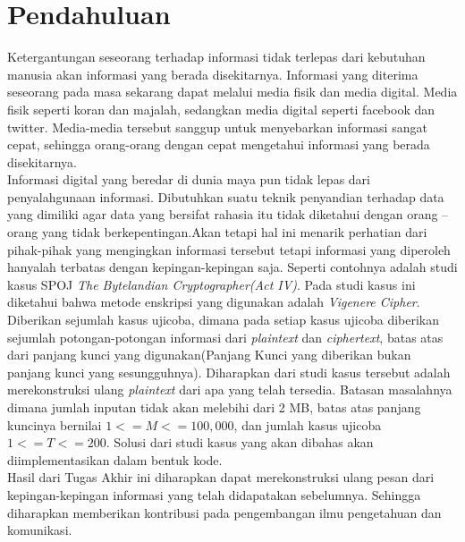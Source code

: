 \section{Pendahuluan}
Ketergantungan seseorang terhadap informasi tidak terlepas dari kebutuhan manusia akan informasi yang berada disekitarnya. Informasi yang diterima seseorang pada masa sekarang dapat melalui media fisik dan media digital. Media fisik seperti koran dan majalah, sedangkan media digital seperti facebook dan twitter. Media-media tersebut sanggup untuk menyebarkan informasi sangat cepat, sehingga orang-orang dengan cepat mengetahui informasi yang berada disekitarnya.
\\
\indent Informasi digital yang beredar di dunia maya pun tidak lepas dari penyalahgunaan informasi. Dibutuhkan suatu teknik penyandian terhadap data yang dimiliki agar data yang bersifat rahasia itu tidak diketahui dengan orang – orang yang tidak berkepentingan.Akan tetapi hal ini menarik perhatian dari pihak-pihak yang mengingkan informasi tersebut tetapi informasi yang diperoleh hanyalah terbatas dengan kepingan-kepingan saja. Seperti contohnya adalah studi kasus SPOJ \textit{The Bytelandian Cryptographer(Act IV)}. Pada studi kasus ini diketahui bahwa metode enskripsi yang digunakan adalah \textit{Vigenere Cipher}. Diberikan sejumlah kasus ujicoba, dimana pada setiap kasus ujicoba diberikan sejumlah potongan-potongan informasi dari \textit{plaintext} dan \textit{ciphertext}, batas atas dari panjang kunci yang digunakan(Panjang Kunci yang diberikan bukan panjang kunci yang sesungguhnya). Diharapkan dari studi kasus tersebut adalah merekonstruksi ulang \textit{plaintext} dari apa yang telah tersedia. Batasan masalahnya dimana jumlah inputan tidak akan melebihi dari 2 MB, batas atas panjang kuncinya bernilai $1<=M<=100,000$, dan jumlah kasus ujicoba $1<=T<=200$. Solusi dari studi kasus yang akan dibahas akan diimplementasikan dalam bentuk kode. 
\\
\indent Hasil dari Tugas Akhir ini diharapkan dapat merekonstruksi ulang pesan dari kepingan-kepingan informasi yang telah didapatakan sebelumnya. Sehingga diharapkan memberikan kontribusi pada pengembangan ilmu pengetahuan dan komunikasi. 
